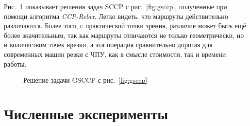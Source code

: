 \documentclass[10pt]{SPIIRAS_Proceedings}
\begin{document}
Рис.~\ref{fig:gsccp-cut}
показывает решения задач SCCP
с рис.~\ref{fig:gsccp},
полученные при помощи алгоритма
{\it CCP-Relax}.
Легко видеть,
что маршруты действительно различаются.
Более того,
с практической точки зрения,
различие может быть ещё более значительным,
так как маршруты отличаются не только
геометрически,
но и количеством точек врезки,
а эта операция сравнительно дорогая
для современных машин резки с ЧПУ,
как в смысле стоимости,
так и времени работы.

\begin{figure}
  \centering
  \caption{Решение задачи GSCCP с рис.~\ref{fig:gsccp}}
  \label{fig:gsccp-cut}
\end{figure}

\section{Численные эксперименты}
\end{document}
